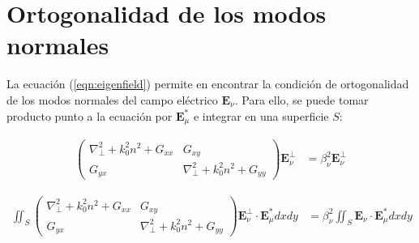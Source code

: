 \chapter{Ortogonalidad de los modos normales \label{sec:orto}}

La ecuación (\ref{eqn:eigenfield}) permite en encontrar la condición de ortogonalidad de los modos normales del campo eléctrico  $\textbf{E}_\nu$. Para ello, se puede tomar producto punto a la ecuación por $\textbf{E}_\mu^*$ e integrar en una superficie $S$:

\begin{align*}
	\begin{pmatrix}
	\nabla_\perp^2  + k_0^2n^2 + G_{xx} & G_{xy} 
	\\
	G_{yx}  & \nabla_\perp^2  + k_0^2n^2 + G_{yy} 
	\end{pmatrix}
\textbf{E}^\perp_\nu
		&=
	\beta_\nu^2 \textbf{E}^\perp_\nu
\end{align*}

\begin{align*}
	 \iint_S \begin{pmatrix}
	\nabla_\perp^2  + k_0^2n^2 + G_{xx} & G_{xy} 
	\\
	G_{yx}  & \nabla_\perp^2  + k_0^2n^2 + G_{yy} 
	\end{pmatrix}
\textbf{E}^\perp_\nu \cdot\textbf{E}_\mu^* dxdy &= \beta_\nu^2 \iint_S \textbf{E}_\nu \cdot\textbf{E}_\mu^* dxdy
\end{align*}


